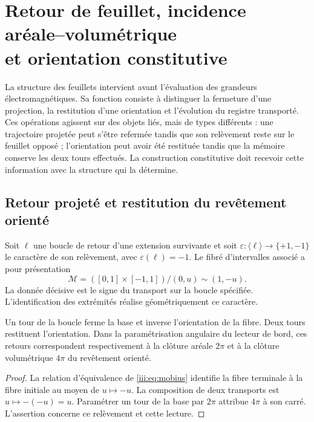 \section[Retour de feuillet, incidence aréale--volumétrique et orientation constitutive]{Retour de feuillet, incidence aréale--volumétrique\\et orientation constitutive}
\label{iii:sec:hojas}

La structure des feuillets intervient avant l’évaluation des grandeurs
électromagnétiques. Sa fonction consiste à distinguer la fermeture d’une projection,
la restitution d’une orientation et l’évolution du registre transporté.
Ces opérations agissent sur des objets liés, mais de types différents : une
trajectoire projetée peut s’être refermée tandis que son relèvement reste
sur le feuillet opposé ; l’orientation peut avoir été restituée tandis que la mémoire
conserve les deux tours effectués. La construction constitutive doit recevoir
cette information avec la structure qui la détermine.

\subsection{Retour projeté et restitution du revêtement orienté}

Soit $\ell$ une boucle de retour d’une extension survivante et soit
$\varepsilon:\langle\ell\rangle\to\{+1,-1\}$ le caractère de son
relèvement, avec $\varepsilon(\ell)=-1$. Le fibré d’intervalles associé
a pour présentation
\begin{equation}
 \mathcal M=([0,1]\times[-1,1])/{(0,u)\sim(1,-u)}.
 \label{iii:eq:mobius}
\end{equation}
La donnée décisive est le signe du transport sur la boucle spécifiée.
L’identification des extrémités réalise géométriquement ce caractère.

\begin{proposition}
Un tour de la boucle ferme la base et inverse l’orientation de la fibre. Deux
tours restituent l’orientation. Dans la paramétrisation angulaire du lecteur de
bord, ces retours correspondent respectivement à la clôture aréale $2\pi$ et
à la clôture volumétrique $4\pi$ du revêtement orienté.
\end{proposition}
\begin{proof}
La relation d’équivalence de \eqref{iii:eq:mobius} identifie la fibre terminale
à la fibre initiale au moyen de $u\mapsto-u$. La composition de deux transports est
$u\mapsto-(-u)=u$. Paramétrer un tour de la base par $2\pi$ attribue $4\pi$
à son carré. L’assertion concerne ce relèvement et cette lecture.
\end{proof}

